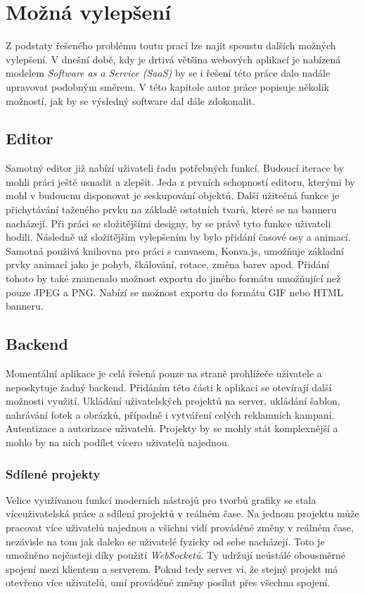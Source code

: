 \chapter{Možná vylepšení}
\label{chap:future}
Z podstaty řešeného problému toutu prací lze najít spoustu dalších možných vylepšení. V dnešní době, kdy je drtivá většina webových
aplikací je nabízená modelem \emph{Software as a Service (SaaS)} by se i řešení této práce dalo nadále upravovat podobným směrem.
V této kapitole autor práce popisuje několik možností, jak by se výsledný software dal dále zdokonalit.

\section{Editor}
Samotný editor již nabízí uživateli řadu potřebných funkcí. Budoucí iterace by mohli práci ještě usnadit a zlepšit. Jeda z prvních schopností
editoru, kterými by mohl v budoucnu disponovat je seskupování objektů. Další užitečná funkce je přichytávání taženého prvku na základě 
ostatních tvarů, které se na banneru nacházejí. Při práci se složitějšími designy, by se právě tyto funkce uživateli hodili.
Následně už složitějším vylepšením by bylo přidání časové osy a animací. Samotná použivá knihovna pro práci s canvasem, Konva.js, umožňuje základní
prvky animací jako je pohyb, škálování, rotace, změna barev apod. Přidání tohoto by také znamenalo možnost exportu do jiného formátu umožňující 
než pouze JPEG a PNG. Nabízí se možnost exportu do formátu GIF nebo HTML banneru.

\section{Backend}
Momentální aplikace je celá řešená pouze na straně prohlížeče uživatele a neposkytuje žadný backend. Přidáním této části k aplikaci se otevírají
další možnosti využití. Ukládání uživatelských projektů na server, ukládání šablon, nahrávání fotek a obrázků, případně i vytváření celých reklamních 
kampaní. Autentizace a autorizace uživatelů. Projekty by se mohly stát komplexnější a mohlo by na nich podílet vícero uživatelů najednou.

\subsection{Sdílené projekty}
Velice využívanou funkcí moderních nástrojů pro tvorbů grafiky se stala víceuživatelská práce a sdílení projektů v reálném čase. Na jednom projektu
může pracovat více uživatelů najednou a všichni vidí prováděné změny v reálném čase, nezávisle na tom jak daleko se uživatelé fyzicky od sebe 
nacházejí. Toto je umožněno nejčasteji díky použití \emph{WebSocketů}. Ty udržují neústálé obousměrné spojení mezi klientem a serverem. Pokud tedy server
ví, že stejný projekt má otevřeno více uživatelů, umí prováděné změny posílat přes všechna spojení.

